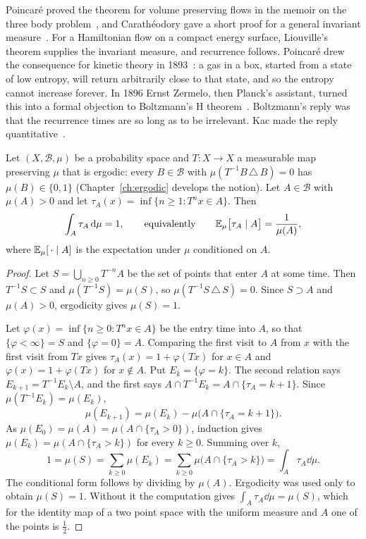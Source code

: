 Poincar\'e proved the theorem for volume preserving flows in the memoir on the three body problem~\cite{poincare1890}, and Carath\'eodory gave a short proof for a general invariant measure~\cite{caratheodory1919}. For a Hamiltonian flow on a compact energy surface, Liouville's theorem supplies the invariant measure, and recurrence follows. Poincar\'e drew the consequence for kinetic theory in 1893~\cite{poincare1893}: a gas in a box, started from a state of low entropy, will return arbitrarily close to that state, and so the entropy cannot increase forever. In 1896 Ernst Zermelo, then Planck's assistant, turned this into a formal objection to Boltzmann's H theorem~\cite{zermelo1896}. Boltzmann's reply was that the recurrence times are so long as to be irrelevant. Kac made the reply quantitative~\cite{kac1947}.

\begin{theorem}
\label{thm:kac_lemma}
Let $(X,\mathcal{B},\mu)$ be a probability space and $T:X\to X$ a measurable map preserving $\mu$ that is ergodic: every $B\in\mathcal{B}$ with $\mu(T^{-1}B\,\triangle\,B)=0$ has $\mu(B)\in\{0,1\}$ (Chapter~\ref{ch:ergodic} develops the notion). Let $A\in\mathcal{B}$ with $\mu(A)>0$ and let $\tau_A(x) = \inf\{n\geq 1: T^n x\in A\}$. Then
\[
\int_A \tau_A \,\mathrm{d}\mu = 1,\qquad\text{equivalently}\qquad \mathbb{E}_\mu\big[\tau_A\mid A\big] = \frac{1}{\mu(A)},
\]
where $\mathbb{E}_\mu[\,\cdot\mid A]$ is the expectation under $\mu$ conditioned on $A$.
\end{theorem}

\begin{proof}
Let $S = \bigcup_{n\geq0}T^{-n}A$ be the set of points that enter $A$ at some time. Then $T^{-1}S\subset S$ and $\mu(T^{-1}S) = \mu(S)$, so $\mu(T^{-1}S\,\triangle\,S) = 0$. Since $S\supset A$ and $\mu(A)>0$, ergodicity gives $\mu(S) = 1$.

Let $\varphi(x) = \inf\{n\geq0:T^nx\in A\}$ be the entry time into $A$, so that $\{\varphi<\infty\} = S$ and $\{\varphi = 0\} = A$. Comparing the first visit to $A$ from $x$ with the first visit from $Tx$ gives $\tau_A(x) = 1+\varphi(Tx)$ for $x\in A$ and $\varphi(x) = 1+\varphi(Tx)$ for $x\notin A$. Put $E_k = \{\varphi = k\}$. The second relation says $E_{k+1} = T^{-1}E_k\setminus A$, and the first says $A\cap T^{-1}E_k = A\cap\{\tau_A = k+1\}$. Since $\mu(T^{-1}E_k) = \mu(E_k)$,
\[
\mu(E_{k+1}) = \mu(E_k) - \mu\big(A\cap\{\tau_A = k+1\}\big).
\]
As $\mu(E_0) = \mu(A) = \mu(A\cap\{\tau_A>0\})$, induction gives $\mu(E_k) = \mu(A\cap\{\tau_A>k\})$ for every $k\geq0$. Summing over $k$,
\[
1 = \mu(S) = \sum_{k\geq0}\mu(E_k) = \sum_{k\geq0}\mu\big(A\cap\{\tau_A>k\}\big) = \int_A\tau_A\dd\mu.
\]
The conditional form follows by dividing by $\mu(A)$. Ergodicity was used only to obtain $\mu(S) = 1$. Without it the computation gives $\int_A\tau_A\dd\mu = \mu(S)$, which for the identity map of a two point space with the uniform measure and $A$ one of the points is $\tfrac12$.
\end{proof}

